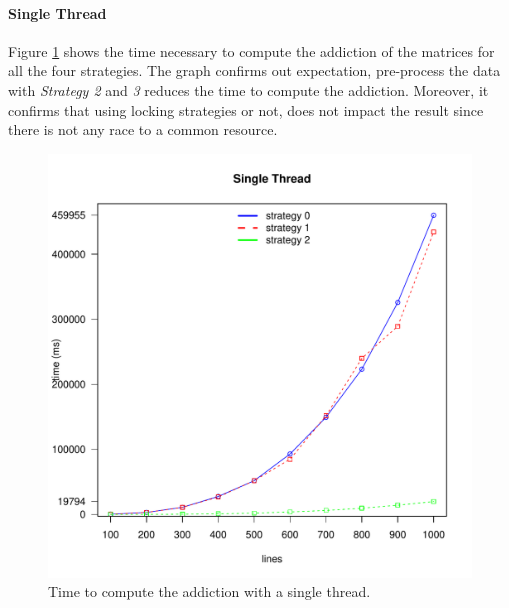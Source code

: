 \documentclass[]{article}
\begin{document}
\paragraph{Single Thread}
Figure \ref{fig:all_single} shows the time necessary to compute the addiction of the matrices for all the four strategies. 
The graph confirms out expectation, pre-process the data with \textit{Strategy 2} and \textit{3} reduces the time to compute the addiction.
Moreover, it confirms that using locking strategies or not, does not impact the result since there is not any race to a common resource.
\begin{figure}[H]
	\centering
	\includegraphics[width=1\textwidth]{img/all_single.pdf}
	\caption
	{Time to compute the addiction with a single thread.}
	\label{fig:all_single}
\end{figure}

\newpage
\end{document}
